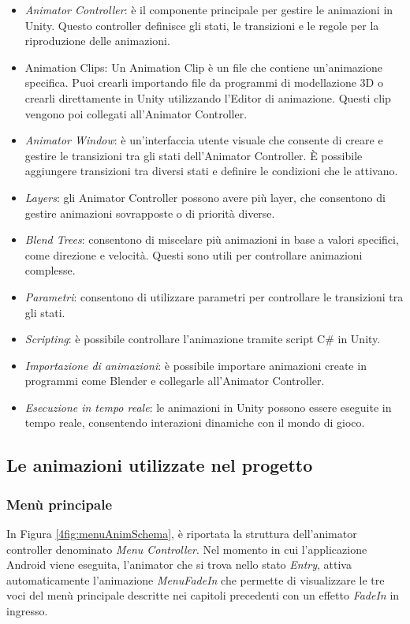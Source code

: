 \begin{itemize}
    \item \textit{Animator Controller}: è il componente principale per gestire le animazioni in Unity. Questo controller definisce gli stati, le transizioni e le regole per la riproduzione delle animazioni.
    \item Animation Clips: Un Animation Clip è un file che contiene un'animazione specifica. Puoi crearli importando file da programmi di modellazione 3D o crearli direttamente in Unity utilizzando l'Editor di animazione. Questi clip vengono poi collegati all'Animator Controller.
    \item \textit{Animator Window}: è un'interfaccia utente visuale che consente di creare e gestire le transizioni tra gli stati dell'Animator Controller. È possibile aggiungere transizioni tra diversi stati e definire le condizioni che le attivano.
    \item \textit{Layers}: gli Animator Controller possono avere più layer, che consentono di gestire animazioni sovrapposte o di priorità diverse.
    \item \textit{Blend Trees}: consentono di miscelare più animazioni in base a valori specifici, come direzione e velocità. Questi sono utili per controllare animazioni complesse.
    \item \textit{Parametri}: consentono di utilizzare parametri per controllare le transizioni tra gli stati.
    \item \textit{Scripting}: è possibile controllare l'animazione tramite script C\# in Unity.
    \item \textit{Importazione di animazioni}: è possibile importare animazioni create in programmi come Blender e collegarle all'Animator Controller.
    \item \textit{Esecuzione in tempo reale}: le animazioni in Unity possono essere eseguite in tempo reale, consentendo interazioni dinamiche con il mondo di gioco.
\end{itemize}

\subsection{Le animazioni utilizzate nel progetto}

\subsubsection{Menù principale}

In Figura \ref{4fig:menuAnimSchema}, è riportata la struttura dell'animator controller denominato \textit{Menu Controller}. Nel momento in cui l'applicazione Android viene eseguita, l'animator che si trova nello stato \textit{Entry}, attiva automaticamente l'animazione \textit{MenuFadeIn} che permette di visualizzare le tre voci del menù principale descritte nei capitoli precedenti con un effetto \textit{FadeIn} in ingresso.

